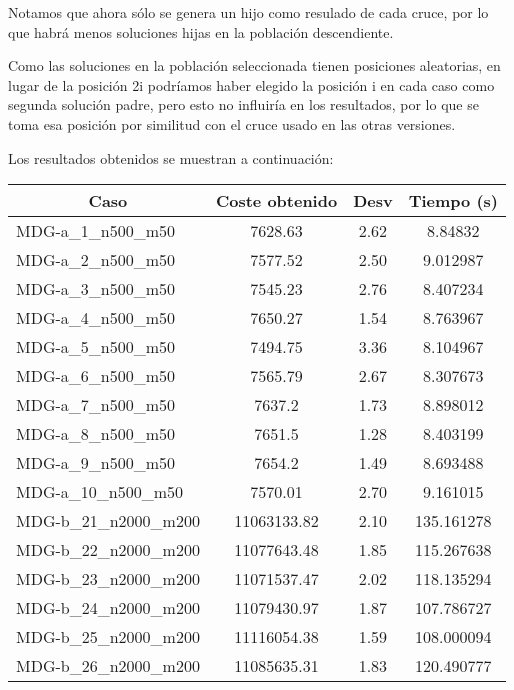 \documentclass[10pt,a4paper]{article}
\begin{document}
Notamos que ahora sólo se genera un hijo como resulado de cada cruce, por lo que habrá menos soluciones hijas en la población descendiente. 

Como las soluciones en la población seleccionada tienen posiciones aleatorias, en lugar de la posición 2i podríamos haber elegido la posición i en cada caso como segunda solución padre, pero esto no influiría en los resultados, por lo que se toma esa posición por similitud con el cruce usado en las otras versiones. 

Los resultados obtenidos se muestran a continuación:

\begin{table}[H]
	\begin{center}
		\begin{tabular}{|l|c|c|c|} 
			\hline
			\multicolumn{1}{|c|}{\textbf{Caso}} & \textbf{Coste obtenido} & \textbf{Desv} & \textbf{Tiempo (s)} \\ \hline
			\hline
					MDG-a\_1\_n500\_m50 & 7628.63 & 2.62 & 8.84832 \\ \hline
					MDG-a\_2\_n500\_m50 & 7577.52 & 2.50 & 9.012987 \\ \hline
					MDG-a\_3\_n500\_m50 & 7545.23 & 2.76 & 8.407234 \\ \hline
					MDG-a\_4\_n500\_m50 & 7650.27 & 1.54 & 8.763967 \\ \hline
					MDG-a\_5\_n500\_m50 & 7494.75 & 3.36 & 8.104967 \\ \hline
					MDG-a\_6\_n500\_m50 & 7565.79 & 2.67 & 8.307673 \\ \hline
					MDG-a\_7\_n500\_m50 & 7637.2 & 1.73 & 8.898012 \\ \hline
					MDG-a\_8\_n500\_m50 & 7651.5 & 1.28 & 8.403199 \\ \hline
					MDG-a\_9\_n500\_m50 & 7654.2 & 1.49 & 8.693488 \\ \hline
					MDG-a\_10\_n500\_m50 & 7570.01 & 2.70 & 9.161015 \\ \hline
					MDG-b\_21\_n2000\_m200 & 11063133.82 & 2.10 & 135.161278 \\ \hline
					MDG-b\_22\_n2000\_m200 & 11077643.48 & 1.85 & 115.267638 \\ \hline
					MDG-b\_23\_n2000\_m200 & 11071537.47 & 2.02 & 118.135294 \\ \hline
					MDG-b\_24\_n2000\_m200 & 11079430.97 & 1.87 & 107.786727 \\ \hline
					MDG-b\_25\_n2000\_m200 & 11116054.38 & 1.59 & 108.000094 \\ \hline
					MDG-b\_26\_n2000\_m200 & 11085635.31 & 1.83 & 120.490777 \\ \hline

\end{tabular}
\end{center}
\end{table}
\end{document}
